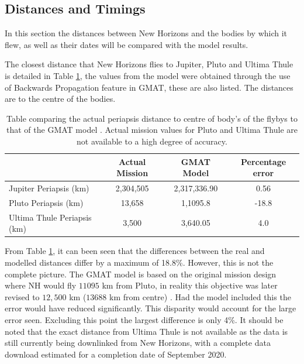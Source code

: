 \documentclass[11pt]{article}
\begin{document}
\subsection{Distances and Timings}

In this section the distances between New Horizons and the bodies by which it flew, as well as their dates will be compared with the model results.

The closest distance that New Horizons flies to Jupiter, Pluto and Ultima Thule is detailed in Table \ref{tab:peri}, the values from the model were obtained through the use of Backwards Propagation feature in GMAT, these are also listed. The distances are to  the centre of the bodies.

\begin{table}[H]
\centering
\caption{Table comparing the actual periapsis distance to centre of body's of the flybys to that of the GMAT model \cite{plutoperi}\cite{jupperi}. Actual mission values for Pluto and Ultima Thule are not available to a high degree of accuracy.}
\begin{tabular}{l|cc|c|}
\cline{2-4}
\multicolumn{1}{c|}{}                                                     & \cellcolor[HTML]{CBCEFB}Actual Mission & \cellcolor[HTML]{CBCEFB}GMAT Model & \cellcolor[HTML]{CBCEFB}Percentage error \\ \hline
\multicolumn{1}{|l|}{\cellcolor[HTML]{FFFFC7}Jupiter Periapsis (km)}      & 2,304,505                              & 2,317,336.90                       & 0.56                                     \\
\multicolumn{1}{|l|}{\cellcolor[HTML]{FFFFC7}Pluto Periapsis (km)}        & 13,658                                 & 1,1095.8                           & -18.8                                    \\
\multicolumn{1}{|l|}{\cellcolor[HTML]{FFFFC7}Ultima Thule Periapsis (km)} & 3,500                                  & 3,640.05                           & 4.0                                      \\ \hline
\end{tabular}
\label{tab:peri}
\end{table}

From Table \ref{tab:peri}, it can been seen that the differences between the real and modelled distances differ by a maximum of 18.8\%. However, this is not the complete picture. The GMAT model is based on the original mission design where NH would fly $11095$ km from Pluto, in reality this objective was later revised to $12,500$ km ($13688$ km from centre) \cite{jupperi}. Had the model included this the error would have reduced significantly. This disparity would account for the large error seen. Excluding this point the largest difference is only 4\%. It should be noted that the exact distance from Ultima Thule is not available as the data is still currently being downlinked from New Horizons, with a complete data download estimated for a completion date of September 2020.
\end{document}
